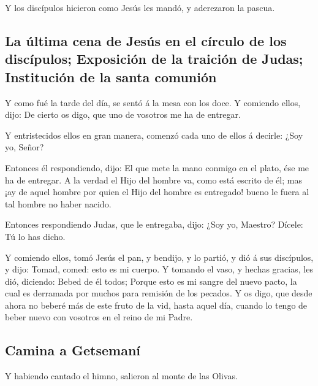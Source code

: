  Y los discípulos hicieron como Jesús les mandó, y
aderezaron la pascua.

\hypertarget{la-uxfaltima-cena-de-jesuxfas-en-el-cuxedrculo-de-los-discuxedpulos-exposiciuxf3n-de-la-traiciuxf3n-de-judas-instituciuxf3n-de-la-santa-comuniuxf3n}{%
\subsection{La última cena de Jesús en el círculo de los discípulos;
Exposición de la traición de Judas; Institución de la santa
comunión}\label{la-uxfaltima-cena-de-jesuxfas-en-el-cuxedrculo-de-los-discuxedpulos-exposiciuxf3n-de-la-traiciuxf3n-de-judas-instituciuxf3n-de-la-santa-comuniuxf3n}}

 Y como fué la tarde del día, se sentó á la mesa con los
doce.  Y comiendo ellos, dijo: De cierto os digo, que uno
de vosotros me ha de entregar.

 Y entristecidos ellos en gran manera, comenzó cada uno de
ellos á decirle: ¿Soy yo, Señor?

 Entonces él respondiendo, dijo: El que mete la mano
conmigo en el plato, ése me ha de entregar.  A la verdad el
Hijo del hombre va, como está escrito de él; mas ¡ay de aquel hombre por
quien el Hijo del hombre es entregado! bueno le fuera al tal hombre no
haber nacido.

 Entonces respondiendo Judas, que le entregaba, dijo: ¿Soy
yo, Maestro? Dícele: Tú lo has dicho.

 Y comiendo ellos, tomó Jesús el pan, y bendijo, y lo
partió, y dió á sus discípulos, y dijo: Tomad, comed: esto es mi cuerpo.
 Y tomando el vaso, y hechas gracias, les dió, diciendo:
Bebed de él todos;  Porque esto es mi sangre del nuevo
pacto, la cual es derramada por muchos para remisión de los pecados.
 Y os digo, que desde ahora no beberé más de este fruto de
la vid, hasta aquel día, cuando lo tengo de beber nuevo con vosotros en
el reino de mi Padre.

\hypertarget{camina-a-getsemanuxed}{%
\subsection{Camina a Getsemaní}\label{camina-a-getsemanuxed}}

 Y habiendo cantado el himno, salieron al monte de las
Olivas.

